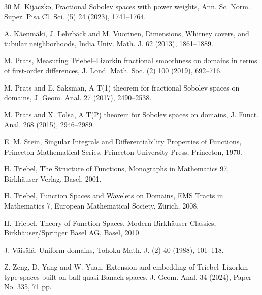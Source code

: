 \documentclass[11pt,twoside]{article}
\theoremstyle{mylem}
\theoremstyle{definition}
\numberwithin{equation}{section}
\begin{document}
\begin{thebibliography}{30}
\vspace{-0.3cm}
M. Kijaczko, Fractional Sobolev spaces with power weights, Ann. Sc. Norm. Super. Pisa Cl. Sci. (5) 24 (2023), 1741--1764.

\vspace{-0.3cm}
A. K\"{a}enm\"{a}ki, J. Lehrb\"{a}ck and M. Vuorinen, Dimensions, Whitney covers, and tubular neighborhoods, India Univ. Math. J. 62 (2013), 1861--1889.


\vspace{-0.3cm}
M. Prats, Measuring Triebel--Lizorkin fractional smoothness on domains in terms of first-order differences, J. Lond. Math. Soc. (2) 100 (2019), 692--716.

\vspace{-0.3cm}
M. Prats and E. Saksman, A T(1) theorem for fractional Sobolev spaces on domains, J. Geom. Anal. 27 (2017), 2490--2538.

\vspace{-0.3cm}
M. Prats and X. Tolsa, A T(P) theorem for Sobolev spaces on domains, J. Funct. Anal. 268 (2015), 2946--2989.

\vspace{-0.3cm}
E. M. Stein, Singular Integrals and Differentiability Properties of Functions, Princeton Mathematical Series, Princeton University Press, Princeton, 1970.


\vspace{-0.3cm}
H. Triebel, The Structure of Functions, Monographs in Mathematics 97, Birkh\"{a}user Verlag, Basel, 2001.

\vspace{-0.3cm}
H. Triebel, Function Spaces and Wavelets on Domains, EMS Tracts in Mathematics 7, European Mathematical Society, Z\"{u}rich, 2008.

\vspace{-0.3cm}
H. Triebel, Theory of Function Spaces, Modern Birkh\"{a}user Classics, Birkh\"{a}user/Springer Basel AG, Basel, 2010.

\vspace{-0.3cm}
J. V\"{a}is\"{a}l\"{a}, Uniform domains, Tohoku Math. J. (2) 40 (1988), 101--118.


\vspace{-0.3cm}
Z. Zeng, D. Yang and W. Yuan, Extension and embedding of Triebel--Lizorkin-type spaces built on ball quasi-Banach spaces, J. Geom. Anal. 34 (2024), Paper No. 335, 71 pp.

\end{thebibliography}
\end{document}
